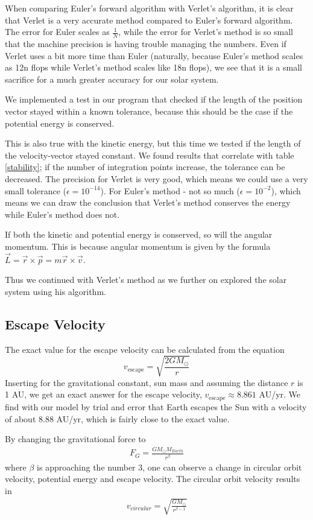 \documentclass{article}
\begin{document}
When comparing Euler's forward algorithm with Verlet's algorithm, it is clear that Verlet is a very accurate method compared to Euler's forward algorithm. The error for Euler scales as $\frac{1}{N}$, while the error for Verlet's method is so small that the machine precision is having trouble managing the numbers. Even if Verlet uses a bit more time than Euler (naturally, because Euler's method scales as 12n flops while Verlet's method scales like 18n flops), we see that it is a small sacrifice for a much greater accuracy for our solar system.

We implemented a test in our program that checked if the length of the position vector stayed within a known tolerance, because this should be the case if the potential energy is conserved.

This is also true with the kinetic energy, but this time we tested if the length of the velocity-vector stayed constant. We found results that correlate with table \ref{stability}; if the number of integration points increase, the tolerance can be decreased. The precision for Verlet is very good, which means we could use a very small tolerance ($\epsilon = 10^{-14}$). For Euler's method - not so much ($\epsilon = 10^{-2}$), which means we can draw the conclusion that Verlet's method conserves the energy while Euler's method does not.

If both the kinetic and potential energy is conserved, so will the angular momentum. This is because angular momentum is given by the formula $\vec{L}=\vec{r} \times \vec{p} =m \vec{r} \times \vec{v}$.


Thus we continued with Verlet's method as we further on explored the solar system using his algorithm.

\subsection{Escape Velocity}
The exact value for the escape velocity can be calculated from the equation
$$v_{\mathrm{escape}}=\sqrt{\frac{2GM_{\odot}}{r}}$$
Inserting for the gravitational constant, sun mass and assuming the distance $r$ is 1 AU, we get an exact answer for the escape velocity, $v_{\mathrm{escape}}\approx 8.861$ AU/yr. We find with our model by trial and error that Earth escapes the Sun with a velocity of about $8.88$ AU/yr, which is fairly close to the exact value.

By changing the gravitational force to
\begin{align*}
  F_G = \frac{GM_{\odot}M_{Earth}}{r^{\beta}}
\end{align*}
where $\beta$ is approaching the number $3$, one can observe a change in circular orbit velocity, potential energy and escape velocity. The circular orbit velocity results in
\begin{align*}
  v_{circular}=\sqrt{\frac{GM_{\odot}}{r^{\beta-1}}}
\end{align*}
\end{document}
